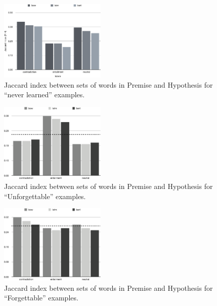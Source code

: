 \begin{figure}[t]
\centering
  \includegraphics[width=0.45\textwidth]{figures/wordoverlap_unlearned.pdf}
  \caption{Jaccard index between sets of words in Premise and Hypothesis for ``never learned'' examples.}
\label{fig:wordoverlap-unlearned}
\end{figure}

\begin{figure}[t]
\centering
  \includegraphics[width=0.45\textwidth]{figures/wordoverlap_unforgettables.pdf}
  \caption{Jaccard index between sets of words in Premise and Hypothesis for ``Unforgettable'' examples.}
\label{fig:wordoverlap-unforg}
\end{figure}

\begin{figure}[t]
\centering
  \includegraphics[width=0.45\textwidth]{figures/wordoverlap_forg.pdf}
  \caption{Jaccard index between sets of words in Premise and Hypothesis for ``Forgettable'' examples.}
\label{fig:wordoverlap-forg}
\end{figure}
\fi

